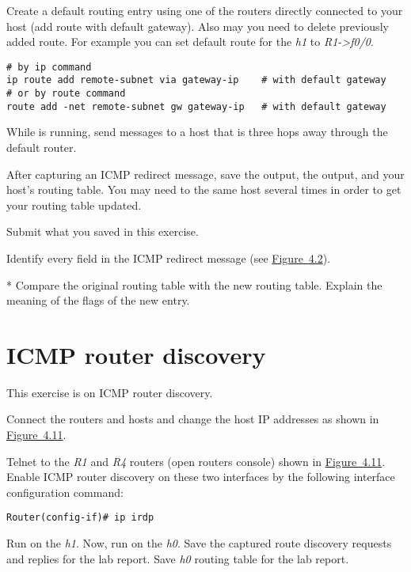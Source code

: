 \documentclass{../UTNetLab}
\begin{document}
    Create a default routing entry using one of the routers directly connected to your host (add route with default gateway).
    Also may you need to delete previously added route.
    For example you can set default route for the \textit{h1} to \textit{R1->f0/0}.

    \begin{lstlisting}[emph={eth0,gateway-ip,remote-subnet},morekeywords={[3]add,dev,via,gw}]
# by ip command
ip route add remote-subnet via gateway-ip    # with default gateway
# or by route command
route add -net remote-subnet gw gateway-ip   # with default gateway
    \end{lstlisting}

    While  is running, send  messages to a host that is three hops away through the default router.

    After capturing an ICMP redirect message, save the  output, the  output, and your host’s routing table.
    You may need to  the same host several times in order to get your routing table updated.
    
    \begin{report}
        \item Submit what you saved in this exercise.
        
        \item Identify every field in the ICMP redirect message (see \hyperref[fig:4.2]{Figure~4.2}).
        
        \item [*] Compare the original routing table with the new routing table.
    Explain the meaning of the flags of the new entry.
    \end{report}

\section{ICMP router discovery}\label{sec:ICMPRD}
    This exercise is on ICMP router discovery.
    
    Connect the routers and hosts and change the host IP addresses as shown in \hyperref[fig:4.11]{Figure~4.11}.
    
    Telnet to the \textit{R1} and \textit{R4} routers (open routers console) shown in \hyperref[fig:4.11]{Figure~4.11}.
    Enable ICMP router discovery on these two interfaces by the following interface configuration command:
    \begin{lstlisting}[language={cisco}]
Router(config-if)# ip irdp
    \end{lstlisting}
    Run  on the \textit{h1}.
    Now, run  on the \textit{h0}.
    Save the captured route discovery requests and replies for the lab report.
    Save \textit{h0} routing table for the lab report.
    
\end{document}
